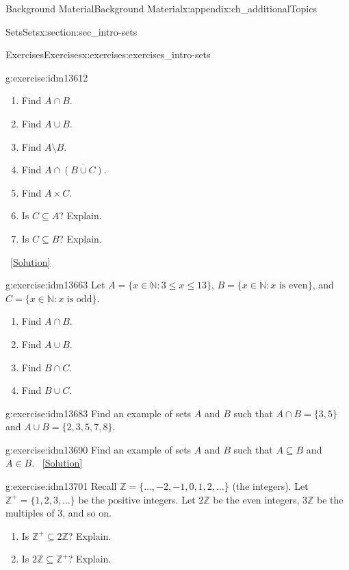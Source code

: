 \documentclass[oneside,10pt,]{book}
\numberwithin{equation}{chapter}
\def\N{\mathbb N}
\def\Z{\mathbb Z}
\def\st{:}
\begin{document}
\begin{appendixptx}{Background Material}{}{Background Material}{}{}{x:appendix:ch_additionalTopics}
\begin{sectionptx}{Sets}{}{Sets}{}{}{x:section:sec_intro-sets}
\begin{exercises-subsection}{Exercises}{}{Exercises}{}{}{x:exercises:exercises_intro-sets}
\begin{divisionexercise}{1}{}{}{g:exercise:idm13612}
\begin{enumerate}[label=(\alph*)]
\item{}Find \(A \cap B\).%
\item{}Find \(A \cup B\).%
\item{}Find \(A \setminus B\).%
\item{}Find \(A \cap \overline{(B \cup C)}\).%
\item{}Find \(A \times C\).%
\item{}Is \(C \subseteq A\)? Explain.%
\item{}Is \(C \subseteq B\)? Explain.%
\end{enumerate}
%
\qquad~\hfill{\tiny\hyperlink{g:solution:idm13641-main}{[Solution]}}\end{divisionexercise}%
\begin{divisionexercise}{2}{}{}{g:exercise:idm13663}%
Let \(A = \{x \in \N \st 3 \le x \le 13\}\), \(B = \{x \in \N \st x \mbox{ is even} \}\), and \(C = \{x \in \N \st x \mbox{ is odd} \}\).%
\par
%
\begin{enumerate}[label=(\alph*)]
\item{}Find \(A \cap B\).%
\item{}Find \(A \cup B\).%
\item{}Find \(B \cap C\).%
\item{}Find \(B \cup C\).%
\end{enumerate}
%
\end{divisionexercise}%
\begin{divisionexercise}{3}{}{}{g:exercise:idm13683}%
Find an example of sets \(A\) and \(B\) such that \(A\cap B = \{3, 5\}\) and \(A \cup B = \{2, 3, 5, 7, 8\}\).%
\end{divisionexercise}%
\begin{divisionexercise}{4}{}{}{g:exercise:idm13690}%
Find an example of sets \(A\) and \(B\) such that \(A \subseteq B\) and \(A \in B\).%
\qquad~\hfill{\tiny\hyperlink{g:solution:idm13697-main}{[Solution]}}\end{divisionexercise}%
\begin{divisionexercise}{5}{}{}{g:exercise:idm13701}%
Recall \(\Z = \{\ldots,-2,-1,0, 1,2,\ldots\}\) (the integers). Let \(\Z^+ = \{1, 2, 3, \ldots\}\) be the positive integers. Let \(2\Z\) be the even integers, \(3\Z\) be the multiples of 3, and so on.%
\par
%
\begin{enumerate}[label=(\alph*)]
\item{}Is \(\Z^+ \subseteq 2\Z\)? Explain.%
\item{}Is \(2\Z \subseteq \Z^+\)? Explain.%

\end{enumerate}
\end{divisionexercise}
\end{exercises-subsection}
\end{sectionptx}
\end{appendixptx}
\end{document}
